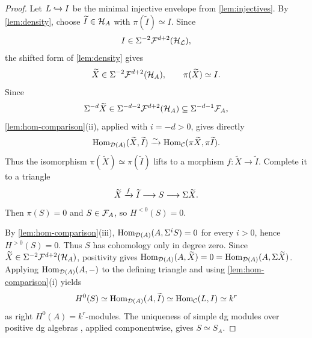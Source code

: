 \documentclass[11pt,a4paper,dvipsnames,x11names]{amsart}
\begin{document}
\begin{proof}
    Let $L\hookrightarrow I$ be the minimal injective envelope from \cref{lem:injectives}. By \cref{lem:density}, choose $\widetilde I\in\mathcal H_A$ with $\pi(\widetilde I)\simeq I$. Since
    \[
    I\in\Sigma^{-2}\mathcal F^{d+2}(\mathcal H_{\mathcal L}),
    \]
    the shifted form of \cref{lem:density} gives
    \[
    \widetilde X\in\Sigma^{-2}\mathcal F^{d+2}(\mathcal H_A),
    \qquad \pi(\widetilde X)\simeq I.
    \]
    Since
    \[
    \Sigma^{-d}\widetilde X
    \in\Sigma^{-d-2}\mathcal F^{d+2}(\mathcal H_A)
    \subseteq\Sigma^{-d-1}\mathcal F_A,
    \]
    \cref{lem:hom-comparison}(ii), applied with $i=-d>0$, gives directly
    \[
    \operatorname{Hom}_{\mathcal D(A)}(\widetilde X,\widetilde I)\xrightarrow{\sim}\operatorname{Hom}_{\mathcal C}(\pi\widetilde X,\pi\widetilde I).
    \]
    Thus the isomorphism $\pi(\widetilde X)\simeq\pi(\widetilde I)$ lifts to a morphism $f:\widetilde X\to\widetilde I$. Complete it to a triangle
    \[
    \widetilde X\xrightarrow{f}\widetilde I\longrightarrow S\longrightarrow\Sigma\widetilde X.
    \]
    Then $\pi(S)=0$ and $S\in\mathcal F_A$, so $H^{<0}(S)=0$.
    
    By \cref{lem:hom-comparison}(iii), $\operatorname{Hom}_{\mathcal D(A)}(A,\Sigma^iS)=0$ for every $i>0$, hence $H^{>0}(S)=0$. Thus $S$ has cohomology only in degree zero. Since $\widetilde X\in\Sigma^{-2}\mathcal F^{d+2}(\mathcal H_A)$, positivity gives $\operatorname{Hom}_{\mathcal D(A)}(A,\widetilde X)=0=\operatorname{Hom}_{\mathcal D(A)}(A,\Sigma\widetilde X)$. Applying $\operatorname{Hom}_{\mathcal D(A)}(A,-)$ to the defining triangle and using \cref{lem:hom-comparison}(i) yields
    \[
    H^0(S)\simeq\operatorname{Hom}_{\mathcal D(A)}(A,\widetilde I)\simeq\operatorname{Hom}_{\mathcal C}(L,I)\simeq k^r
    \]
    as right $H^0(A)=k^r$-modules. The uniqueness of simple dg modules over positive dg algebras \cite[Corollary~5.7]{KN13}, applied componentwise, gives $S\simeq S_A$.
    \end{proof}
\end{document}
